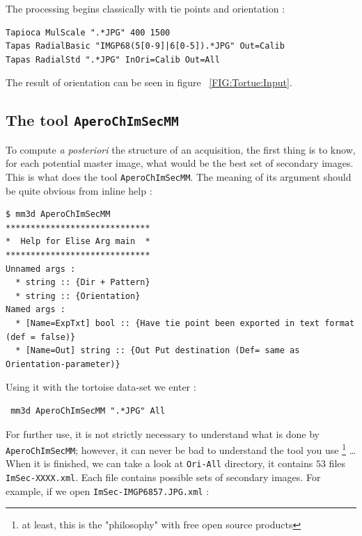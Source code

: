 The processing begins classically with tie points and orientation :

\begin{verbatim}
Tapioca MulScale ".*JPG" 400 1500
Tapas RadialBasic "IMGP68(5[0-9]|6[0-5]).*JPG" Out=Calib
Tapas RadialStd ".*JPG" InOri=Calib Out=All
\end{verbatim}

The result of orientation can be seen in figure ~\ref{FIG:Tortue:Input}.



\subsection{The tool {\tt AperoChImSecMM}}

To compute \emph{a posteriori} the structure of an acquisition, the first thing is to know,
for each potential master image, what would be the best set of secondary  images.
This is what does the tool {\tt AperoChImSecMM}. The meaning of its argument should be
quite obvious from inline help :

\begin{verbatim}
$ mm3d AperoChImSecMM
*****************************
*  Help for Elise Arg main  *
*****************************
Unnamed args : 
  * string :: {Dir + Pattern}
  * string :: {Orientation}
Named args : 
  * [Name=ExpTxt] bool :: {Have tie point been exported in text format (def = false)}
  * [Name=Out] string :: {Out Put destination (Def= same as Orientation-parameter)}
\end{verbatim}

Using it with the tortoise data-set we enter :

\begin{verbatim}
 mm3d AperoChImSecMM ".*JPG" All 
\end{verbatim}

For further use, it is not strictly necessary to understand what is done
 by {\tt AperoChImSecMM}; however, it  can never be bad to understand the tool you use
\footnote{at least, this is the "philosophy" with free open source products} \dots 
When it is finished, we can take a look at  {\tt Ori-All} directory, it
contains $53$ files  {\tt ImSec-XXXX.xml}. Each file contains possible sets of secondary images.
For example, if we open {\tt ImSec-IMGP6857.JPG.xml}  :

